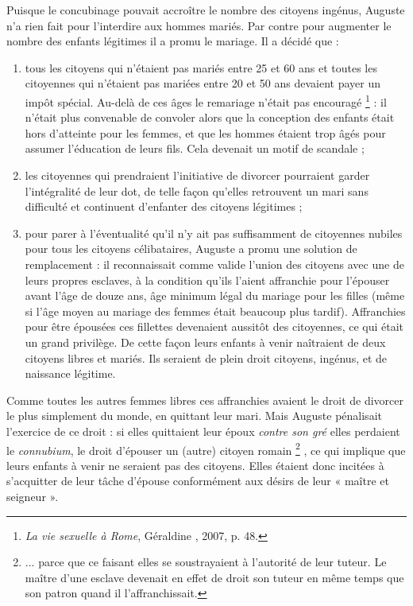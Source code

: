  Puisque le concubinage pouvait accroître le nombre des citoyens ingénus, Auguste n'a rien fait pour l'interdire aux hommes mariés. Par contre pour augmenter le nombre des enfants légitimes il a promu le mariage. Il a décidé que : 
\begin{enumerate}
\item tous les citoyens qui n'étaient pas mariés entre 25 et 60 ans et toutes les citoyennes qui n'étaient pas mariées entre 20 et 50 ans devaient payer un impôt spécial. Au-delà de ces âges le remariage n'était pas encouragé%
\footnote{\emph{La vie sexuelle à Rome}, Géraldine , 2007, p. 48.}
: il n'était plus convenable de convoler alors que la conception des enfants était hors d'atteinte pour les femmes, et que les hommes étaient trop âgés pour assumer l'éducation de leurs fils. Cela devenait un motif de scandale ;
\item les citoyennes qui prendraient l'initiative de divorcer pourraient garder l'intégralité de leur dot, de telle façon qu'elles retrouvent un mari sans difficulté et continuent d'enfanter des citoyens légitimes ;
\item pour parer à l'éventualité qu'il n'y ait pas suffisamment de citoyennes nubiles pour tous les citoyens célibataires, Auguste a promu une solution de remplacement : il reconnaissait comme valide l'union des citoyens avec une de leurs propres esclaves, à la condition qu'ils l'aient affranchie pour l'épouser avant l'âge de douze ans, âge minimum légal du mariage pour les filles (même si l'âge moyen au mariage des femmes était beaucoup plus tardif). Affranchies pour être épousées ces fillettes devenaient aussitôt des citoyennes, ce qui était un grand privilège. De cette façon leurs enfants à venir naîtraient de deux citoyens libres et mariés. Ils seraient de plein droit citoyens, ingénus, et de naissance légitime. 
\end{enumerate}

 Comme toutes les autres femmes libres ces affranchies avaient le droit de divorcer le plus simplement du monde, en quittant leur mari. Mais Auguste pénalisait l'exercice de ce droit : si elles quittaient leur époux \emph{contre son gré} elles perdaient le \emph{connubium}, le droit d'épouser un (autre) citoyen romain%
\footnote{... parce que ce faisant elles se soustrayaient à l'autorité de leur tuteur. Le maître d'une esclave devenait en effet de droit son tuteur en même temps que son patron quand il l'affranchissait.}%
, ce qui implique que leurs enfants à venir ne seraient pas des citoyens. Elles étaient donc incitées à s'acquitter de leur tâche d'épouse conformément aux désirs de leur « maître et seigneur ».

